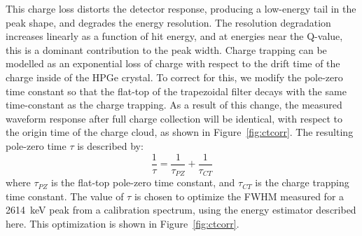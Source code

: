 \documentclass[/main.tex]{subfiles}
\begin{document}
This charge loss distorts the detector response, producing a low-energy tail in the peak shape, and degrades the energy resolution.
The resolution degradation increases linearly as a function of hit energy, and at energies near the Q-value, this is a dominant contribution to the peak width.
Charge trapping can be modelled as an exponential loss of charge with respect to the drift time of the charge inside of the HPGe crystal.
To correct for this, we modify the pole-zero time constant so that the flat-top of the trapezoidal filter decays with the same time-constant as the charge trapping.
As a result of this change, the measured waveform response after full charge collection will be identical, with respect to the origin time of the charge cloud, as shown in Figure~\ref{fig:ctcorr}.
The resulting pole-zero time $\tau$ is described by:
\begin{equation}
  \frac{1}{\tau} = \frac{1}{\tau_{PZ}} + \frac{1}{\tau_{CT}}
\end{equation}
where $\tau_{PZ}$ is the flat-top pole-zero time constant, and $\tau_{CT}$ is the charge trapping time constant.
The value of $\tau$ is chosen to optimize the FWHM measured for a 2614~keV peak from a  calibration spectrum, using the energy estimator described here.
This optimization is shown in Figure~\ref{fig:ctcorr}.
\end{document}
